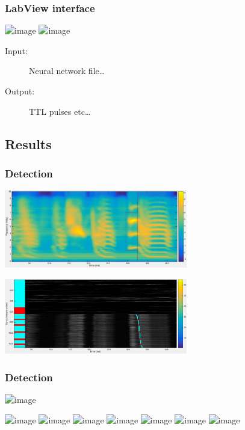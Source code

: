 \documentclass{beamer}
\begin{document}
\begin{frame}
  \frametitle{LabView interface}

  \includegraphics<1>[width=11cm]{labview-spaghetti}
  \includegraphics<2>[width=11cm]{labview-frontend}

  \begin{description}
    \item[Input:] Neural network file\dots
    \item[Output:] TTL pulses etc\dots
  \end{description}
\end{frame}

\subsection{Results}

\begin{frame}
  \frametitle{Detection}
  \begin{center}
    \includegraphics[width=8cm]{song-spectrogram-with-alignment-1}
  \end{center}
  \par
  \begin{center}
    \includegraphics[width=8cm]{song-spectrogram-with-alignment-2}
  \end{center}
\end{frame}

\begin{frame}
  \frametitle{Detection}
  \includegraphics<1->[width=\textwidth]{syllablebank-0}
  \par
  \includegraphics<2>[width=\textwidth]{syllablebank-1}
  \includegraphics<3>[width=\textwidth]{syllablebank-2}
  \includegraphics<4>[width=\textwidth]{syllablebank-3}
  \includegraphics<5>[width=\textwidth]{syllablebank-4}
  \includegraphics<6>[width=\textwidth]{syllablebank-5}
  \includegraphics<7>[width=\textwidth]{syllablebank-6}
  \includegraphics<8>[width=\textwidth]{syllablebank-roc}
\end{frame}
\end{document}
